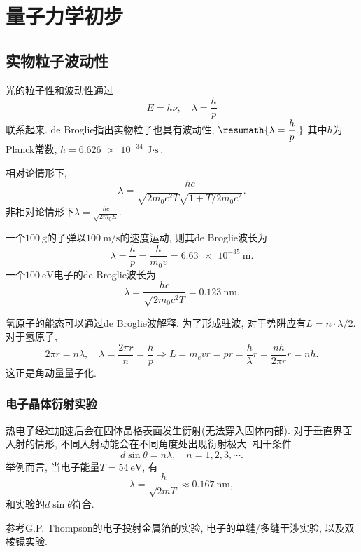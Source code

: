 \documentclass[hidelinks]{ctexart}
\begin{document}
\section{量子力学初步} %
\label{sec:量子力学初步}

\subsection{实物粒子波动性} %
\label{sub:实物粒子波动性}

光的粒子性和波动性通过
\[ E = h \nu,\quad \lambda = \frac{h}{p} \]
联系起来. de Broglie指出实物粒子也具有波动性, $\displaystyle \resumath{ \lambda = \frac{h}{p}.}$ 其中$h$为Planck常数, $h=\SI{6.626e-34}{\joule\cdot\second}$.
\par
相对论情形下,
\[ \lambda = \frac{hc}{\sqrt{2m_0 c^2 T}\sqrt{1+T/2m_0c^2}}. \]
非相对论情形下$\displaystyle \lambda = \frac{hc}{\sqrt{2m_0 E}}$.
\begin{sample}
    \begin{ex}
        一个$\SI{100}{\gram}$的子弹以$\SI{100}{\meter\per\second}$的速度运动, 则其de Broglie波长为
        \[ \lambda = \frac{h}{p} = \frac{h}{m_0 v} = \SI{6.63e-35}{\meter}. \]
        一个$\SI{100}{\eV}$电子的de Broglie波长为
        \[ \lambda = \frac{hc}{\sqrt{2m_0c^2T}} = \SI{0.123}{\nano\meter}. \]
    \end{ex}
\end{sample}
氢原子的能态可以通过de Broglie波解释. 为了形成驻波, 对于势阱应有$\displaystyle L = n\cdot \lambda/2$. 对于氢原子,
\[ 2\pi r = n\lambda,\quad \lambda = \frac{2\pi r}{n} = \frac{h}{p} \Rightarrow L = m_e vr = pr = \frac{h}{\lambda} r = \frac{nh}{2\pi r}r = n\hbar. \]
这正是角动量量子化.

\subsubsection{电子晶体衍射实验} %
\label{ssub:电子晶体衍射实验}

热电子经过加速后会在固体晶格表面发生衍射(无法穿入固体内部). 对于垂直界面入射的情形, 不同入射动能会在不同角度处出现衍射极大. 相干条件
\[ d \sin \theta = n\lambda,\quad n = 1,2,3,\cdots. \]
举例而言, 当电子能量$T = \SI{54}{\eV}$, 有
\[ \lambda = \frac{h}{\sqrt{2mT}} \approx \SI{0.167}{\nano\meter}, \]
和实验的$d\sin\theta$符合.
\begin{figure}[ht]
    \centering
\end{figure}
\begin{remark}
    参考G.P. Thompson的电子投射金属箔的实验, 电子的单缝/多缝干涉实验, 以及双棱镜实验.
\end{remark}
\end{document}
